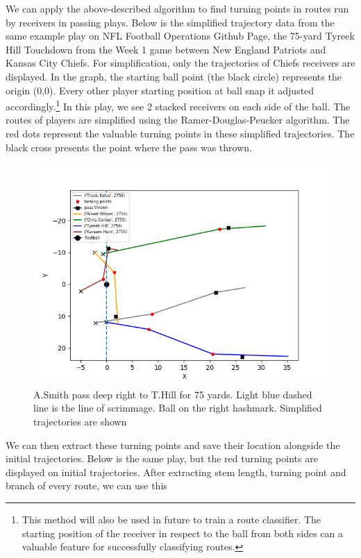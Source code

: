 \documentclass[12pt,oneside]{dukestatscithesis}
\theoremstyle{definition}
\theoremstyle{definition}
\theoremstyle{definition}
\theoremstyle{remark}
\begin{document}
We can apply the above-described algorithm to find turning points in
routes run by receivers in passing plays. Below is the simplified
trajectory data from the same example play on NFL Football Operations
Github Page, the 75-yard Tyreek Hill Touchdown from the Week 1 game
between New England Patriots and Kansas City Chiefs. For simplification,
only the trajectories of Chiefs receivers are displayed. In the graph,
the starting ball point (the black circle) represents the origin (0,0).
Every other player starting position at ball snap it adjusted
accordingly.\footnote{This method will also be used in future to train a
  route classifier. The starting position of the receiver in respect to
  the ball from both sides can a valuable feature for successfully
  classifying routes.} In this play, we see 2 stacked receivers on each
side of the ball. The routes of players are simplified using the
Ramer-Douglas-Peucker algorithm. The red dots represent the valuable
turning points in these simplified trajectories. The black cross
presents the point where the pass was thrown.
\begin{figure}
\includegraphics[width=8.89in,angle=360, scale=0.6]{figure/2756_simple} \caption{A.Smith pass deep right to T.Hill for 75 yards. Light blue dashed line is the line of scrimmage. Ball on the right hashmark. Simplified trajectories are shown}\label{fig:2756simple}
\end{figure}
We can then extract these turning points and save their location
alongside the initial trajectories. Below is the same play, but the red
turning points are displayed on initial trajectories. After extracting
stem length, turning point and branch of every route, we can use this
\end{document}
